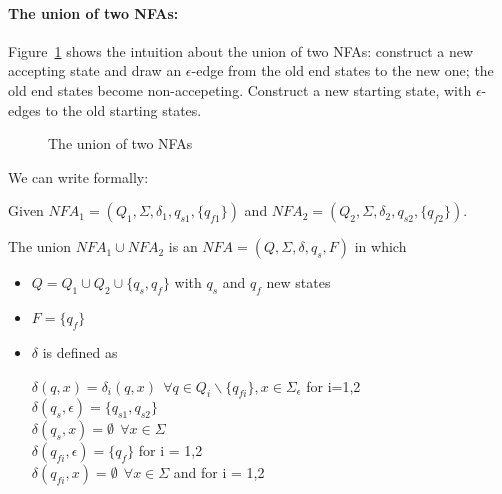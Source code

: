 \paragraph{The union of two NFAs:}


Figure~\ref{uniefsa} shows the intuition about the union of two NFAs:
construct a new accepting state and draw an $\epsilon$-edge from the
old end states to the new one; the old end states become
non-accepeting. Construct a new starting state, with $\epsilon$-edges
to the old starting states.


\begin{figure}[h]
\caption{The union of two NFAs\label{uniefsa}}
\end{figure}


We can write formally:

Given $NFA_1 = (Q_1,\Sigma,\delta_1,q_{s1},\{q_{f1}\})$ and
%
$NFA_2 = (Q_2,\Sigma,\delta_2,q_{s2},\{q_{f2}\})$.

The union $NFA_1 \cup NFA_2$ is an $NFA = (Q,\Sigma,\delta,q_s,F)$
in which
\begin{itemize}
\item $Q = Q_1 \cup Q_2 \cup \{q_s,q_f\}$ with $q_s$ and $q_f$ new states
\item $F = \{q_f\}$
\item $\delta$ is defined as

 $\delta(q,x) = \delta_i(q,x)~~\forall q \in Q_i \backslash \{q_{fi}\}, x \in \Sigma_\epsilon$ for i=1,2 \\
 $\delta(q_s,\epsilon) = \{q_{s1}, q_{s2}\}$ \\
 $\delta(q_s,x) = \emptyset ~~\forall x \in \Sigma$ \\
 $\delta(q_{fi},\epsilon) = \{q_f\}$ for i = 1,2 \\
 $\delta(q_{fi}, x) = \emptyset ~~\forall x \in \Sigma$ and for i = 1,2
\end{itemize}


